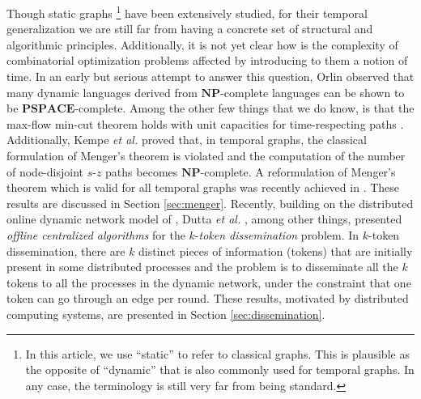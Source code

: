 \documentclass[oribibl, 11pt]{llncs}
\newcommand{\rem}{\mathbf}
\begin{document}
Though static graphs \footnote{In this article, we use ``static'' to refer to classical graphs. This is plausible as the opposite of ``dynamic'' that is also commonly used for temporal graphs. In any case, the terminology is still very far from being standard.} have been extensively studied, for their temporal generalization we are still far from having a concrete set of structural and algorithmic principles. Additionally, it is not yet clear how is the complexity of combinatorial optimization problems affected by introducing to them a notion of time. In an early but serious attempt to answer this question, Orlin \cite{Or81} observed that many dynamic languages derived from $\rem{NP}$-complete languages can be shown to be $\rem{PSPACE}$-complete. Among the other few things that we do know, is that the max-flow min-cut theorem holds with unit capacities for time-respecting paths \cite{Be96}. Additionally, Kempe \emph{et al.} \cite{KKK00} proved that, in temporal graphs, the classical formulation of Menger's theorem is violated and the computation of the number of node-disjoint $s$-$z$ paths becomes $\rem{NP}$-complete. A reformulation of Menger's theorem which is valid for all temporal graphs was recently achieved in \cite{MMCS13}. These results are discussed in Section \ref{sec:menger}. Recently, building on the distributed online dynamic network model of \cite{KLO10}, Dutta \emph{et al.} \cite{DPRS13}, among other things, presented \emph{offline centralized algorithms} for the $k$-\emph{token dissemination} problem. In $k$-token dissemination, there are $k$ distinct pieces of information (tokens) that are initially present in some distributed processes and the problem is to disseminate all the $k$ tokens to all the processes in the dynamic network, under the constraint that one token can go through an edge per round. These results, motivated by distributed computing systems, are presented in Section \ref{sec:dissemination}.
\end{document}
